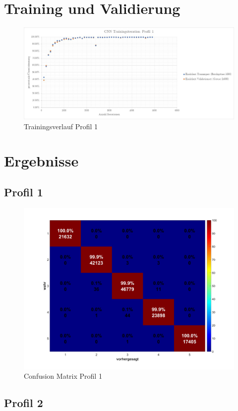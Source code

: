 \section{Training und Validierung}




\begin{figure}[H]
	\centering
	\caption{Trainingsverlauf Profil 1}
	\label{fig:traininsverlauf}
	\includegraphics[width=1.0\linewidth]{fig/Traininsverlauf}
\end{figure}


\section{Ergebnisse}


\subsection{Profil 1}

\begin{figure}[H]
	\centering
	\includegraphics[width=0.7\linewidth]{fig/Profil_1}
	\caption{Confusion Matrix Profil 1}
	\label{fig:profil1}
\end{figure}

\subsection{Profil 2}

